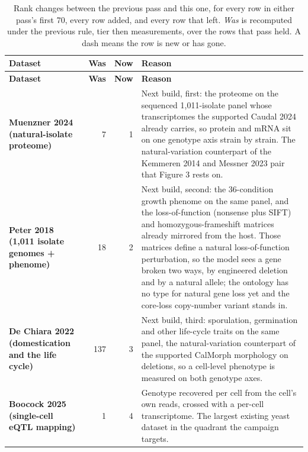 \begingroup
\footnotesize
\setlength{\tabcolsep}{4pt}
\renewcommand{\arraystretch}{1.15}
\begin{longtable}{@{}L{46mm} r@{\hspace{6pt}} r@{\hspace{6pt}} L{104mm}@{}}
\caption[]{Rank changes between the previous pass and this one, for every row in
either pass's first 70, every row added, and every row that left.
\emph{Was} is recomputed under the previous rule, tier then measurements, over the
rows that pass held. A dash means the row is new or has gone.}
\label{tab:swaps}\\
\toprule
\textbf{Dataset} & \textbf{Was} & \textbf{Now} & \textbf{Reason} \\
\midrule
\endfirsthead
\toprule
\textbf{Dataset} & \textbf{Was} & \textbf{Now} & \textbf{Reason} \\
\midrule
\endhead
\bottomrule
\endfoot
\textbf{Muenzner 2024 (natural-isolate proteome)} & 7 & 1 & Next build, first: the proteome on the sequenced 1,011-isolate panel whose transcriptomes the supported Caudal 2024 already carries, so protein and mRNA sit on one genotype axis strain by strain. The natural-variation counterpart of the Kemmeren 2014 and Messner 2023 pair that Figure 3 rests on. \\
\addlinespace[5pt]
\textbf{Peter 2018 (1,011 isolate genomes + phenome)} & 18 & 2 & Next build, second: the 36-condition growth phenome on the same panel, and the loss-of-function (nonsense plus SIFT) and homozygous-frameshift matrices already mirrored from the host. Those matrices define a natural loss-of-function perturbation, so the model sees a gene broken two ways, by engineered deletion and by a natural allele; the ontology has no type for natural gene loss yet and the core-loss copy-number variant stands in. \\
\addlinespace[5pt]
\textbf{De Chiara 2022 (domestication and the life cycle)} & 137 & 3 & Next build, third: sporulation, germination and other life-cycle traits on the same panel, the natural-variation counterpart of the supported CalMorph morphology on deletions, so a cell-level phenotype is measured on both genotype axes. \\
\addlinespace[5pt]
\textbf{Boocock 2025 (single-cell eQTL mapping)} & 1 & 4 & Genotype recovered per cell from the cell's own reads, crossed with a per-cell transcriptome. The largest existing yeast dataset in the quadrant the campaign targets. \\

\end{longtable}
